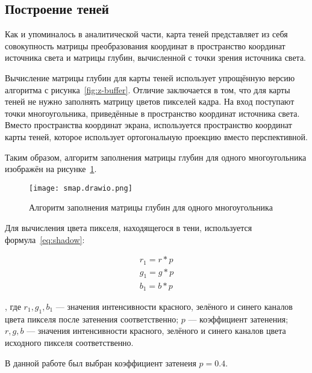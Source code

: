 \subsection{Построение теней}

Как и упоминалось в аналитической части, карта теней представляет из себя совокупность матрицы преобразования координат в пространство координат источника света и матрицы глубин, вычисленной с точки зрения источника света. 

Вычисление матрицы глубин для карты теней использует упрощённую версию алгоритма с рисунка~\ref{fig:z-buffer}. Отличие заключается в том, что для карты теней не нужно заполнять матрицу цветов пикселей кадра. На вход поступают точки многоугольника, приведённые в пространство координат источника света. Вместо пространства координат экрана, используется пространство координат карты теней, которое использует ортогональную проекцию вместо перспективной.

Таким образом, алгоритм заполнения матрицы глубин для одного многоугольника изображён на рисунке~\ref{fig:smap_buffer}.

\begin{figure}[h!]
  \centering
  \texttt{[image: smap.drawio.png]}
  \caption{Алгоритм заполнения матрицы глубин для одного многоугольника}
  \label{fig:smap_buffer}
\end{figure}

Для вычисления цвета пикселя, находящегося в тени, используется формула~\eqref{eq:shadow}:

\begin{equation}
  \label{eq:shadow}
  \begin{split}
    r_1 = r*p \\
    g_1 = g*p \\ 
    b_1 = b*p
  \end{split}
  \end{equation}

, где $r_1, g_1, b_1$ --- значения интенсивности красного, зелёного и синего каналов цвета пикселя после затенения соответственно; $p$ --- коэффициент затенения; $r, g, b$ --- значения интенсивности красного, зелёного и синего каналов цвета исходного пикселя соответственно.

В данной работе был выбран коэффициент затенеия $p = 0.4$.


